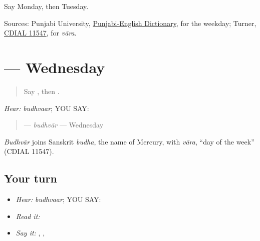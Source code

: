 \begin{tcolorbox}[breakable,colback=teal!4,colframe=teal!35!black,title={Before you move on}]
Say Monday, then Tuesday.

Sources: Punjabi University, \href{https://dic.learnpunjabi.org/default.aspx?look=\%E0\%A8\%AE\%E0\%A9\%B0\%E0\%A8\%97\%E0\%A8\%B2\%E0\%A8\%B5\%E0\%A8\%BE\%E0\%A8\%B0}{Punjabi-English Dictionary}, for the weekday; Turner, \href{https://dsal.uchicago.edu/dictionaries/soas/}{CDIAL 11547}, for \emph{vāra}.
\end{tcolorbox}
\section[\texorpdfstring{\pa{ਬੁੱਧਵਾਰ} (budhvaar)}{ਬੁੱਧਵਾਰ (budhvaar)}]{ — Wednesday}

\label{lesson:PA-C182-budhvar}



\begin{quote}
Say \textbf{}, then \textbf{}.
\end{quote}

\begin{grammarlens}[title={Grammar Lens: one weekday by ear}]
\emph{Hear:} \emph{budhvaar}; YOU SAY: \textbf{}

\begin{quote}
\textbf{} — \emph{budhvār} — Wednesday
\end{quote}
\end{grammarlens}

\begin{cousinweb}
\emph{Budhvār} joins Sanskrit \emph{budha}, the name of Mercury, with \emph{vāra}, \textquotedblleft{}day of the week\textquotedblright{} (CDIAL 11547).
\end{cousinweb}

\subsection*{Your turn}
\begin{itemize}
\raggedright
  \item \emph{Hear:} \emph{budhvaar}; YOU SAY: \textbf{}
  \item \emph{Read it:} \textbf{}
  \item \emph{Say it:} \textbf{}, \textbf{}, \textbf{}
\end{itemize}

